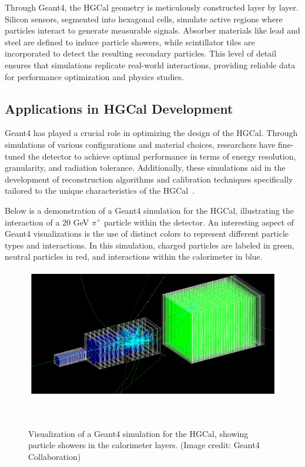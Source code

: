 Through Geant4, the HGCal geometry is meticulously constructed layer by layer. Silicon sensors, segmented into hexagonal cells, simulate active regions where particles interact to generate measurable signals. Absorber materials like lead and steel are defined to induce particle showers, while scintillator tiles are incorporated to detect the resulting secondary particles. This level of detail ensures that simulations replicate real-world interactions, providing reliable data for performance optimization and physics studies.

\subsection{Applications in HGCal Development}

Geant4 has played a crucial role in optimizing the design of the HGCal. Through simulations of various configurations and material choices, researchers have fine-tuned the detector to achieve optimal performance in terms of energy resolution, granularity, and radiation tolerance. Additionally, these simulations aid in the development of reconstruction algorithms and calibration techniques specifically tailored to the unique characteristics of the HGCal~\cite{geant4_toolkit}.


Below is a demonstration of a Geant4 simulation for the HGCal, illustrating the interaction of a 20 GeV $\pi^{+}$ particle within the detector. An interesting aspect of Geant4 visualizations is the use of distinct colors to represent different particle types and interactions. In this simulation, charged particles are labeled in green, neutral particles in red, and interactions within the calorimeter in blue.


\begin{figure}[h]
    \centering
    \includegraphics[width=\textwidth]{Figures/geant4_simulation.png}
    \caption{Visualization of a Geant4 simulation for the HGCal, showing particle showers in the calorimeter layers. (Image credit: Geant4 Collaboration)}~\cite{geant4_simulation}
    \label{fig:geant4_simulation}
\end{figure}

